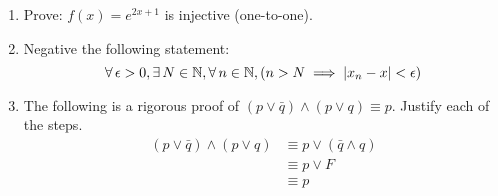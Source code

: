 \documentclass[letterpaper,12pt,fleqn]{article}
\newcommand{\e}{\epsilon}
\begin{document}
\begin{enumerate}[left=0in]
\item Prove: \(f(x)=e^{2x+1}\) is injective (one-to-one).

\item Negative the following statement:
  \[\forall\,\e>0,\exists\,N\in\N,\forall\,n\in\N,(n>N\implies\abs{x_n-x}<\e)\]

\item The following is a rigorous proof of \((p\lor\bar{q})\land(p\lor q)\equiv p\).  Justify each of the steps.
  \begin{align*}
    (p\lor\bar{q})\land(p\lor q) &\equiv p\lor(\bar{q}\land q) \\
    &\equiv p\lor F \\
    &\equiv p
  \end{align*}
\end{enumerate}
\end{document}
